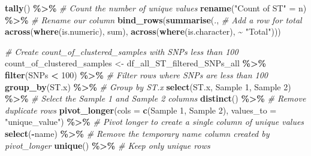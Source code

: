 \documentclass[
]{article}
\newenvironment{Shaded}{\begin{snugshade}}{\end{snugshade}}
\newcommand{\AttributeTok}[1]{\textcolor[rgb]{0.13,0.29,0.53}{#1}}
\newcommand{\CommentTok}[1]{\textcolor[rgb]{0.56,0.35,0.01}{\textit{#1}}}
\newcommand{\DecValTok}[1]{\textcolor[rgb]{0.00,0.00,0.81}{#1}}
\newcommand{\FunctionTok}[1]{\textcolor[rgb]{0.13,0.29,0.53}{\textbf{#1}}}
\newcommand{\NormalTok}[1]{#1}
\newcommand{\OtherTok}[1]{\textcolor[rgb]{0.56,0.35,0.01}{#1}}
\newcommand{\SpecialCharTok}[1]{\textcolor[rgb]{0.81,0.36,0.00}{\textbf{#1}}}
\newcommand{\StringTok}[1]{\textcolor[rgb]{0.31,0.60,0.02}{#1}}
\begin{document}
\begin{Shaded}
\begin{Highlighting}[]
  \FunctionTok{tally}\NormalTok{() }\SpecialCharTok{\%\textgreater{}\%}                                   \CommentTok{\# Count the number of unique values}
  \FunctionTok{rename}\NormalTok{(}\StringTok{"Count of ST"} \OtherTok{=}\NormalTok{ n) }\SpecialCharTok{\%\textgreater{}\%}                 \CommentTok{\# Rename our column}
  \FunctionTok{bind\_rows}\NormalTok{(}\FunctionTok{summarise}\NormalTok{(.,                        }\CommentTok{\# Add a row for total}
                      \FunctionTok{across}\NormalTok{(}\FunctionTok{where}\NormalTok{(is.numeric), sum),}
                      \FunctionTok{across}\NormalTok{(}\FunctionTok{where}\NormalTok{(is.character), }\SpecialCharTok{\textasciitilde{}} \StringTok{"Total"}\NormalTok{)))}

\CommentTok{\# Create count\_of\_clustered\_samples with SNPs less than 100}
\NormalTok{count\_of\_clustered\_samples }\OtherTok{\textless{}{-}}\NormalTok{ df\_all\_ST\_filtered\_SNPs\_all }\SpecialCharTok{\%\textgreater{}\%}
  \FunctionTok{filter}\NormalTok{(SNPs }\SpecialCharTok{\textless{}} \DecValTok{100}\NormalTok{) }\SpecialCharTok{\%\textgreater{}\%}                        \CommentTok{\# Filter rows where SNPs are less than 100}
  \FunctionTok{group\_by}\NormalTok{(ST.x) }\SpecialCharTok{\%\textgreater{}\%}                            \CommentTok{\# Group by ST.x}
  \FunctionTok{select}\NormalTok{(ST.x, }\StringTok{\textasciigrave{}}\AttributeTok{Sample 1}\StringTok{\textasciigrave{}}\NormalTok{, }\StringTok{\textasciigrave{}}\AttributeTok{Sample 2}\StringTok{\textasciigrave{}}\NormalTok{) }\SpecialCharTok{\%\textgreater{}\%}            \CommentTok{\# Select the Sample 1 and Sample 2 columns}
  \FunctionTok{distinct}\NormalTok{() }\SpecialCharTok{\%\textgreater{}\%}                                \CommentTok{\# Remove duplicate rows}
  \FunctionTok{pivot\_longer}\NormalTok{(}\AttributeTok{cols =} \FunctionTok{c}\NormalTok{(}\StringTok{\textasciigrave{}}\AttributeTok{Sample 1}\StringTok{\textasciigrave{}}\NormalTok{, }\StringTok{\textasciigrave{}}\AttributeTok{Sample 2}\StringTok{\textasciigrave{}}\NormalTok{), }\AttributeTok{values\_to =} \StringTok{"unique\_value"}\NormalTok{) }\SpecialCharTok{\%\textgreater{}\%} \CommentTok{\# Pivot longer to create a single column of unique values}
  \FunctionTok{select}\NormalTok{(}\SpecialCharTok{{-}}\NormalTok{name) }\SpecialCharTok{\%\textgreater{}\%}                             \CommentTok{\# Remove the temporary \textquotesingle{}name\textquotesingle{} column created by pivot\_longer}
  \FunctionTok{unique}\NormalTok{() }\SpecialCharTok{\%\textgreater{}\%}                                  \CommentTok{\# Keep only unique rows}

\end{Highlighting}
\end{Shaded}
\end{document}
